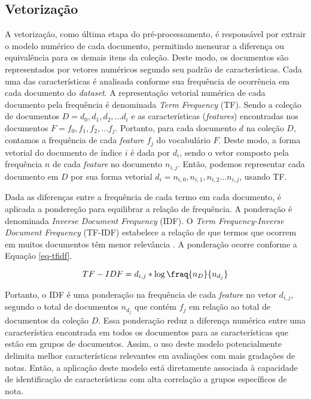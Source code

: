 \subsection{Vetorização}

A vetorização, como última etapa do pré-processamento, é responsável por extrair o modelo numérico de cada documento, permitindo mensurar a diferença ou equivalência para os demais itens da coleção. Deste modo, os documentos são representados por vetores numéricos segundo seu padrão de características. Cada uma das características é analisada conforme sua frequência de ocorrência em cada documento do \textit{dataset}. A representação vetorial numérica de cada documento pela frequência é denominada \textit{Term Frequency} (TF). Sendo a coleção de documentos $ D = { d_{0}, d_{1}, d_{2}, \hdots d_{i} } $ e as características (\textit{features}) encontradas nos documentos $ F = { f_{0}, f_{1}, f_{2}, \hdots f_{j} } $.  Portanto, para cada documento $ d $ na coleção $ D $, contamos a frequência de cada \textit{feature} $ f_{j} $ do vocabulário $ F $. Deste modo, a forma vetorial do documento de índice $ i $ é dada por $ d_{i} $, sendo o vetor composto pela frequência $ n $ de cada \textit{feature} no documento $ n_{i, j} $. Então, podemos representar cada documento em $ D $ por sua forma vetorial $ d_{i} = { n_{i, 0}, n_{i, 1}, n_{i, 2} \hdots n_{i,j}} $, usando TF.

Dada as diferenças entre a frequência de cada termo em cada documento, é aplicada a pondereção para equilibrar a relação de frequência. A ponderação é denominada \textit{Inverse Document Frequency} (IDF). O \textit{Term Frequency-Inverse Document Frequency} (TF-IDF) estabelece a relação de que termos que ocorrem em muitos documentos têm menor relevância \cite{baeza2011}. A ponderação ocorre conforme a Equação \ref{eq-tfidf}.

\begin{equation}
TF-IDF = d_{i,j}* \log \fraq{n_{D}}{n_{d_{j}}} 
\end{equation}


Portanto, o IDF é uma ponderação na frequência de cada \textit{feature} no vetor $ d_{i, j} $, segundo o total de documentos $ n_{d_{j}} $ que contém $ f_{j} $ em relação ao total de documentos da coleção $ D $. Essa ponderação reduz a diferença numérica entre uma característica encontrada em todos os documentos para as características que estão em grupos de documentos. Assim, o uso deste modelo potencialmente delimita melhor características relevantes em avaliações com mais gradações de notas. Então, a aplicação deste modelo está diretamente associada à capacidade de identificação de características com alta correlação a grupos específicos de nota.

